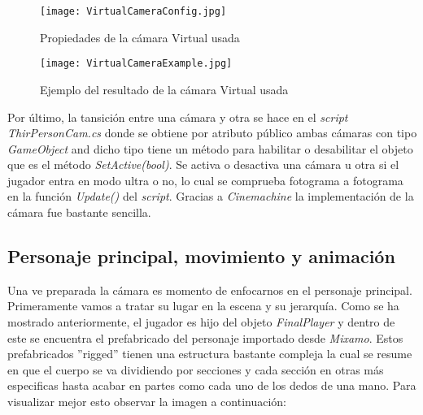 
   

\begin{figure}[H]
    \centering
    \texttt{[image: VirtualCameraConfig.jpg]}
    \caption{Propiedades de la cámara Virtual usada}
\end{figure}
\begin{figure}[H]
    \centering
    \texttt{[image: VirtualCameraExample.jpg]}
    \caption{Ejemplo del resultado de la cámara Virtual usada}
\end{figure}

Por último, la tansición entre una cámara y otra se hace en el \textit{script} \textit{ThirPersonCam.cs} donde se obtiene por atributo público ambas cámaras con tipo \textit{GameObject} and dicho tipo tiene un método para habilitar o desabilitar el objeto que es el método \textit{SetActive(bool)}. Se activa o desactiva una cámara u otra si el jugador entra en modo ultra o no, lo cual se comprueba fotograma a fotograma en la función \textit{Update()} del \textit{script}. Gracias a \textit{Cinemachine} la implementación de la cámara fue bastante sencilla.

\subsection{Personaje principal, movimiento y animación} 

Una ve preparada la cámara es momento de enfocarnos en el personaje principal. Primeramente vamos a tratar su lugar en la escena y su jerarquía. Como se ha mostrado anteriormente, el jugador es hijo del objeto \textit{FinalPlayer} y dentro de este se encuentra el prefabricado del personaje importado desde \textit{Mixamo}. Estos prefabricados ''rigged'' tienen una estructura bastante compleja la cual se resume en que el cuerpo se va dividiendo por secciones y cada sección en otras más especificas hasta acabar en partes como cada uno de los dedos de una mano. Para visualizar mejor esto observar la imagen a continuación: 


